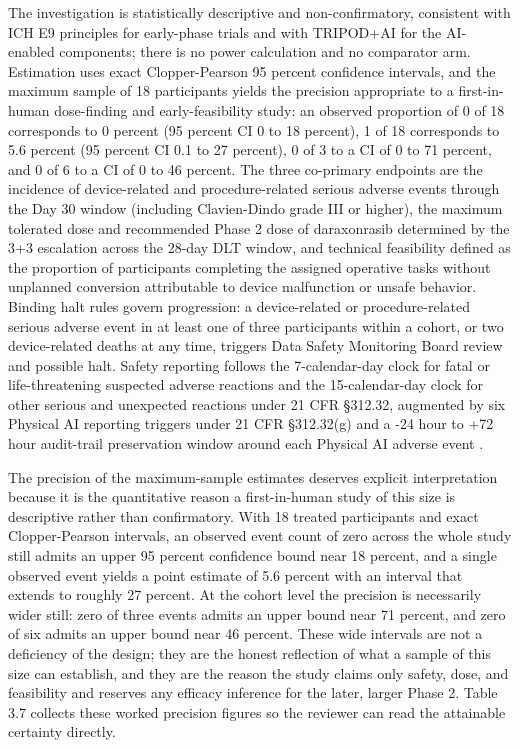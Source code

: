 The investigation is statistically descriptive and non-confirmatory, consistent with
ICH E9 principles for early-phase trials and with TRIPOD+AI for the AI-enabled
components; there is no power calculation and no comparator arm. Estimation uses
exact Clopper-Pearson 95 percent confidence intervals, and the maximum sample of 18
participants yields the precision appropriate to a first-in-human dose-finding and
early-feasibility study: an observed proportion of 0 of 18 corresponds to 0 percent
(95 percent CI 0 to 18 percent), 1 of 18 corresponds to 5.6 percent (95 percent CI
0.1 to 27 percent), 0 of 3 to a CI of 0 to 71 percent, and 0 of 6 to a CI of 0 to 46
percent. The three co-primary endpoints are the incidence of device-related and
procedure-related serious adverse events through the Day 30 window (including
Clavien-Dindo grade III or higher), the maximum tolerated dose and recommended Phase
2 dose of daraxonrasib determined by the 3+3 escalation across the 28-day DLT window,
and technical feasibility defined as the proportion of participants completing the
assigned operative tasks without unplanned conversion attributable to device
malfunction or unsafe behavior. Binding halt rules govern progression: a
device-related or procedure-related serious adverse event in at least one of three
participants within a cohort, or two device-related deaths at any time, triggers Data
Safety Monitoring Board review and possible halt. Safety reporting follows the
7-calendar-day clock for fatal or life-threatening suspected adverse reactions and
the 15-calendar-day clock for other serious and unexpected reactions under 21 CFR
\S 312.32, augmented by six Physical AI reporting triggers under 21 CFR \S 312.32(g)
and a -24 hour to +72 hour audit-trail preservation window around each Physical AI
adverse event \cite{phase1guidance, cfr312paiuni}.

The precision of the maximum-sample estimates deserves explicit interpretation
because it is the quantitative reason a first-in-human study of this size is
descriptive rather than confirmatory. With 18 treated participants and exact
Clopper-Pearson intervals, an observed event count of zero across the whole study
still admits an upper 95 percent confidence bound near 18 percent, and a single
observed event yields a point estimate of 5.6 percent with an interval that extends
to roughly 27 percent. At the cohort level the precision is necessarily wider still:
zero of three events admits an upper bound near 71 percent, and zero of six admits an
upper bound near 46 percent. These wide intervals are not a deficiency of the design;
they are the honest reflection of what a sample of this size can establish, and they
are the reason the study claims only safety, dose, and feasibility and reserves any
efficacy inference for the later, larger Phase 2. Table 3.7 collects these worked
precision figures so the reviewer can read the attainable certainty directly.

